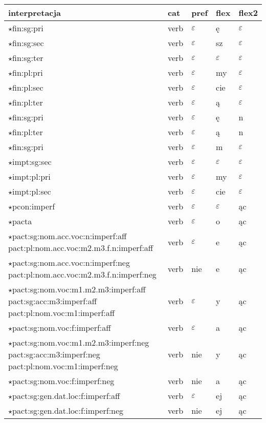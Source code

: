 \documentclass{article}
\begin{document}
\begin{longtable}{p{7cm}|l|l|l|l}
interpretacja & cat & pref & flex & flex2\\
\hline
$\star$fin:sg:pri & verb & $\varepsilon$ & ę & $\varepsilon$\\
$\star$fin:sg:sec & verb & $\varepsilon$ & sz & $\varepsilon$\\
$\star$fin:sg:ter & verb & $\varepsilon$ & $\varepsilon$ & $\varepsilon$\\
$\star$fin:pl:pri & verb & $\varepsilon$ & my & $\varepsilon$\\
$\star$fin:pl:sec & verb & $\varepsilon$ & cie & $\varepsilon$\\
$\star$fin:pl:ter & verb & $\varepsilon$ & ą & $\varepsilon$\\
$\star$fin:sg:pri & verb & $\varepsilon$ & ę & n\\
$\star$fin:pl:ter & verb & $\varepsilon$ & ą & n\\
$\star$fin:sg:pri & verb & $\varepsilon$ & m & $\varepsilon$\\
$\star$impt:sg:sec & verb & $\varepsilon$ & $\varepsilon$ & $\varepsilon$\\
$\star$impt:pl:pri & verb & $\varepsilon$ & my & $\varepsilon$\\
$\star$impt:pl:sec & verb & $\varepsilon$ & cie & $\varepsilon$\\
$\star$pcon:imperf & verb & $\varepsilon$ & $\varepsilon$ & ąc\\
$\star$pacta & verb & $\varepsilon$ & o & ąc\\
$\star$pact:sg:nom.acc.voc:n:imperf:aff pact:pl:nom.acc.voc:m2.m3.f.n:imperf:aff & verb & $\varepsilon$ & e & ąc\\
$\star$pact:sg:nom.acc.voc:n:imperf:neg pact:pl:nom.acc.voc:m2.m3.f.n:imperf:neg & verb & nie & e & ąc\\
$\star$pact:sg:nom.voc:m1.m2.m3:imperf:aff pact:sg:acc:m3:imperf:aff pact:pl:nom.voc:m1:imperf:aff & verb & $\varepsilon$ & y & ąc\\
$\star$pact:sg:nom.voc:f:imperf:aff & verb & $\varepsilon$ & a & ąc\\
$\star$pact:sg:nom.voc:m1.m2.m3:imperf:neg pact:sg:acc:m3:imperf:neg pact:pl:nom.voc:m1:imperf:neg & verb & nie & y & ąc\\
$\star$pact:sg:nom.voc:f:imperf:neg & verb & nie & a & ąc\\
$\star$pact:sg:gen.dat.loc:f:imperf:aff & verb & $\varepsilon$ & ej & ąc\\
$\star$pact:sg:gen.dat.loc:f:imperf:neg & verb & nie & ej & ąc\\

\end{longtable}
\end{document}
